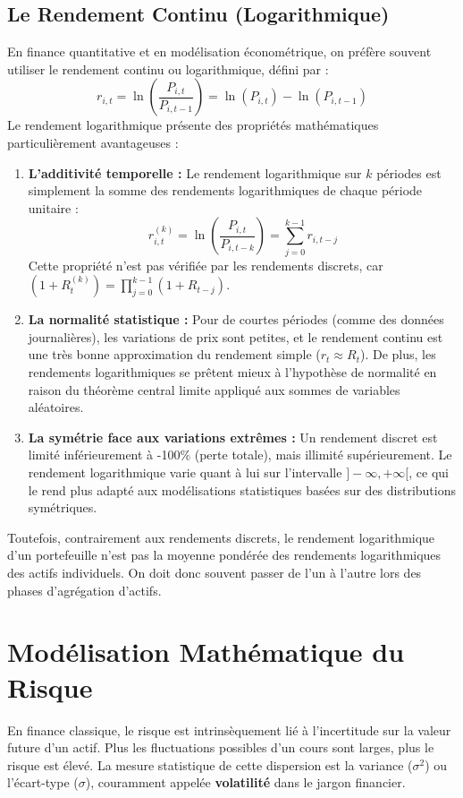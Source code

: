 \subsection{Le Rendement Continu (Logarithmique)}
En finance quantitative et en modélisation économétrique, on préfère souvent utiliser le rendement continu ou logarithmique, défini par :
\begin{equation}
    r_{i,t} = \ln\left(\frac{P_{i,t}}{P_{i,t-1}}\right) = \ln(P_{i,t}) - \ln(P_{i,t-1})
\end{equation}
Le rendement logarithmique présente des propriétés mathématiques particulièrement avantageuses :
\begin{enumerate}
    \item \textbf{L'additivité temporelle :} Le rendement logarithmique sur $k$ périodes est simplement la somme des rendements logarithmiques de chaque période unitaire :
    \begin{equation}
        r_{i,t}^{(k)} = \ln\left(\frac{P_{i,t}}{P_{i,t-k}}\right) = \sum_{j=0}^{k-1} r_{i,t-j}
    \end{equation}
    Cette propriété n'est pas vérifiée par les rendements discrets, car $(1 + R_{t}^{(k)}) = \prod_{j=0}^{k-1} (1 + R_{t-j})$.
    \item \textbf{La normalité statistique :} Pour de courtes périodes (comme des données journalières), les variations de prix sont petites, et le rendement continu est une très bonne approximation du rendement simple ($r_t \approx R_t$). De plus, les rendements logarithmiques se prêtent mieux à l'hypothèse de normalité en raison du théorème central limite appliqué aux sommes de variables aléatoires.
    \item \textbf{La symétrie face aux variations extrêmes :} Un rendement discret est limité inférieurement à -100\% (perte totale), mais illimité supérieurement. Le rendement logarithmique varie quant à lui sur l'intervalle $]-\infty, +\infty[$, ce qui le rend plus adapté aux modélisations statistiques basées sur des distributions symétriques.
\end{enumerate}

Toutefois, contrairement aux rendements discrets, le rendement logarithmique d'un portefeuille n'est pas la moyenne pondérée des rendements logarithmiques des actifs individuels. On doit donc souvent passer de l'un à l'autre lors des phases d'agrégation d'actifs.

\section{Modélisation Mathématique du Risque}
En finance classique, le risque est intrinsèquement lié à l'incertitude sur la valeur future d'un actif. Plus les fluctuations possibles d'un cours sont larges, plus le risque est élevé. La mesure statistique de cette dispersion est la variance ($\sigma^2$) ou l'écart-type ($\sigma$), couramment appelée \textbf{volatilité} dans le jargon financier.

